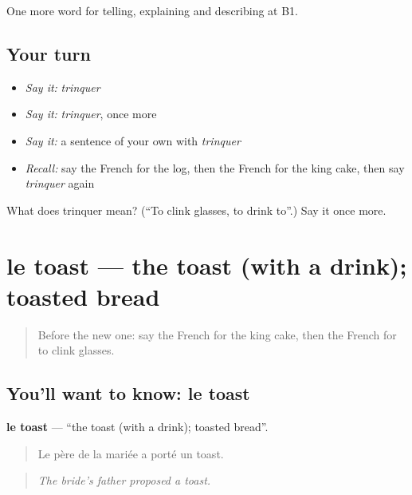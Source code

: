 \begin{grammarlens}[title={What you've built}]
One more word for telling, explaining and describing at B1.
\end{grammarlens}

\subsection*{Your turn}
\begin{itemize}
\raggedright
  \item \emph{Say it:} \emph{trinquer}
  \item \emph{Say it:} \emph{trinquer}, once more
  \item \emph{Say it:} a sentence of your own with \emph{trinquer}
  \item \emph{Recall:} say the French for the log, then the French for the king cake, then say \emph{trinquer} again
\end{itemize}

\begin{tcolorbox}[breakable,colback=teal!4,colframe=teal!35!black,title={Before you move on}]
What does trinquer mean? (\textquotedblleft{}To clink glasses, to drink to\textquotedblright{}.) Say it once more.
\end{tcolorbox}
\section[le toast]{le toast — the toast (with a drink); toasted bread}

\label{lesson:FR-C320-toast}



\begin{quote}
Before the new one: say the French for the king cake, then the French for to clink glasses.
\end{quote}

\subsection*{You'll want to know: le toast}
\textbf{le toast} — \textquotedblleft{}the toast (with a drink); toasted bread\textquotedblright{}.

\begin{quote}
Le père de la mariée a porté un toast.
\end{quote}

\begin{quote}
\emph{The bride's father proposed a toast.}
\end{quote}


